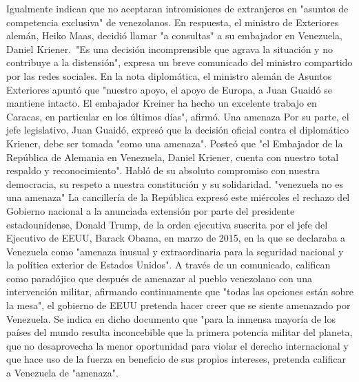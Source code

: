 \documentclass{article}%
\begin{document}
\newline%
%
Igualmente indican que no aceptaran intromisiones de extranjeros en "asuntos de competencia exclusiva" de venezolanos.%
\newline%
%
En respuesta, el ministro de Exteriores alemán, Heiko Maas, decidió llamar "a consultas" a su embajador en Venezuela, Daniel Kriener.~"Es una decisión incomprensible que agrava la situación y no contribuye a la distensión", expresa un breve comunicado del ministro compartido por las redes sociales.%
\newline%
%
En la nota diplomática, el ministro alemán de Asuntos Exteriores apuntó que "nuestro apoyo, el apoyo de Europa, a Juan Guaidó se mantiene intacto. El embajador Kreiner ha hecho un excelente trabajo en Caracas, en particular en los últimos días", afirmó.%
\newline%
%
Una amenaza%
\newline%
%
Por su parte, el jefe legislativo, Juan Guaidó, expresó que la decisión oficial contra el diplomático Kriener, debe ser tomada "como una amenaza".%
\newline%
%
Posteó que "el Embajador de la República de Alemania en Venezuela, Daniel Kriener, cuenta con nuestro total respaldo y reconocimiento". Habló de su absoluto compromiso con nuestra democracia, su respeto a nuestra constitución y su solidaridad.%
\newline%
%
"venezuela no es una amenaza"%
\newline%
%
La cancillería de la República expresó este miércoles el rechazo del Gobierno nacional a la anunciada extensión por parte del presidente estadounidense, Donald Trump, de la orden ejecutiva suscrita por el jefe del Ejecutivo de EEUU, Barack Obama, en marzo de 2015, en la que se declaraba a Venezuela como "amenaza inusual y extraordinaria para la seguridad nacional y la política exterior de Estados Unidos". A través de un comunicado, califican como paradójico que después de amenazar  al pueblo venezolano con una intervención militar, afirmando continuamente que "todas las opciones están sobre la mesa", el gobierno de EEUU pretenda hacer creer que se siente amenazado por Venezuela.%
\newline%
%
Se indica en dicho documento que "para la inmensa mayoría de los países del mundo resulta inconcebible que la primera potencia militar del planeta, que no desaprovecha la menor oportunidad para violar el derecho internacional y que hace uso de la fuerza en beneficio de sus propios intereses, pretenda calificar a Venezuela de "amenaza".%
\newline%
%
\end{document}
